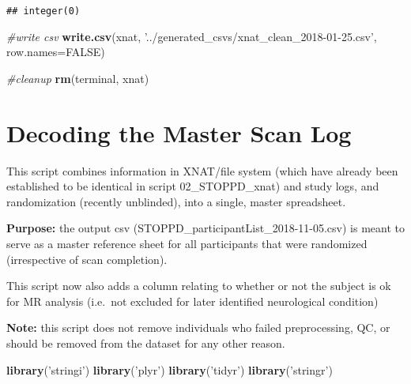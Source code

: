 \documentclass[]{article}
\newenvironment{Shaded}{\begin{snugshade}}{\end{snugshade}}
\newcommand{\KeywordTok}[1]{\textcolor[rgb]{0.13,0.29,0.53}{\textbf{#1}}}
\newcommand{\DataTypeTok}[1]{\textcolor[rgb]{0.13,0.29,0.53}{#1}}
\newcommand{\StringTok}[1]{\textcolor[rgb]{0.31,0.60,0.02}{#1}}
\newcommand{\CommentTok}[1]{\textcolor[rgb]{0.56,0.35,0.01}{\textit{#1}}}
\newcommand{\OtherTok}[1]{\textcolor[rgb]{0.56,0.35,0.01}{#1}}
\newcommand{\NormalTok}[1]{#1}
\theoremstyle{definition}
\theoremstyle{definition}
\theoremstyle{definition}
\theoremstyle{remark}
\begin{document}
\begin{verbatim}
## integer(0)
\end{verbatim}

\begin{Shaded}
\begin{Highlighting}[]
\CommentTok{#write csv}
\KeywordTok{write.csv}\NormalTok{(xnat, }\StringTok{'../generated_csvs/xnat_clean_2018-01-25.csv'}\NormalTok{, }\DataTypeTok{row.names=}\OtherTok{FALSE}\NormalTok{)}

\CommentTok{#cleanup}
\KeywordTok{rm}\NormalTok{(terminal, xnat)}
\end{Highlighting}
\end{Shaded}

\section{Decoding the Master Scan
Log}\label{decoding-the-master-scan-log}

This script combines information in XNAT/file system (which have already
been established to be identical in script 02\_STOPPD\_xnat) and study
logs, and randomization (recently unblinded), into a single, master
spreadsheet.

\textbf{Purpose:} the output csv
(STOPPD\_participantList\_2018-11-05.csv) is meant to serve as a master
reference sheet for all participants that were randomized (irrespective
of scan completion).

This script now also adds a column relating to whether or not the
subject is ok for MR analysis (i.e.~not excluded for later identified
neurological condition)

\textbf{Note:} this script does not remove individuals who failed
preprocessing, QC, or should be removed from the dataset for any other
reason.

\begin{Shaded}
\begin{Highlighting}[]
\KeywordTok{library}\NormalTok{(}\StringTok{'stringi'}\NormalTok{)}
\KeywordTok{library}\NormalTok{(}\StringTok{'plyr'}\NormalTok{)}
\KeywordTok{library}\NormalTok{(}\StringTok{'tidyr'}\NormalTok{)}
\KeywordTok{library}\NormalTok{(}\StringTok{'stringr'}\NormalTok{)}
\end{Highlighting}
\end{Shaded}
\end{document}
